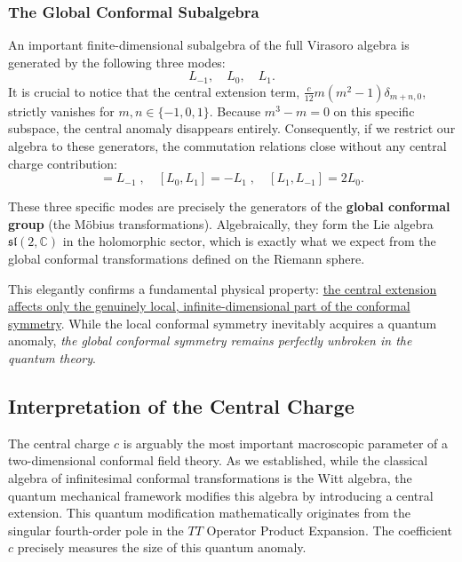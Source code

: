 \subsubsection{The Global Conformal Subalgebra}

An important finite-dimensional subalgebra of the full Virasoro algebra is generated by the following three modes:
\[
    L_{-1}, \quad L_0, \quad L_1.
\]
It is crucial to notice that the central extension term, \(\frac{c}{12}m(m^2-1)\delta_{m+n,0}\), strictly vanishes for \(m, n \in \{-1, 0, 1\}\). Because \(m^3 - m = 0\) on this specific subspace, the central anomaly disappears entirely. Consequently, if we restrict our algebra to these generators, the commutation relations close without any central charge contribution:
\begin{equation}
    [L_0, L_{-1}] = L_{-1} \;, \quad [L_0, L_1] = -L_1 \;, \quad [L_1, L_{-1}] = 2L_0.
    \label{eq:global_conformal_algebra}
\end{equation}

These three specific modes are precisely the generators of the \textbf{global conformal group} (the Möbius transformations). Algebraically, they form the Lie algebra \(\mathfrak{sl}(2, \mathbb{C})\) in the holomorphic sector, which is exactly what we expect from the global conformal transformations defined on the Riemann sphere.

This elegantly confirms a fundamental physical property: \uline{the central extension affects only the genuinely local, infinite-dimensional part of the conformal symmetry}. While the local conformal symmetry inevitably acquires a quantum anomaly, \textit{the global conformal symmetry remains perfectly unbroken in the quantum theory}.

\subsection{Interpretation of the Central Charge}

The central charge \(c\) is arguably the most important macroscopic parameter of a two-dimensional conformal field theory. As we established, while the classical algebra of infinitesimal conformal transformations is the Witt algebra, the quantum mechanical framework modifies this algebra by introducing a central extension. This quantum modification mathematically originates from the singular fourth-order pole in the \(TT\) Operator Product Expansion. The coefficient \(c\) precisely measures the size of this quantum anomaly.

